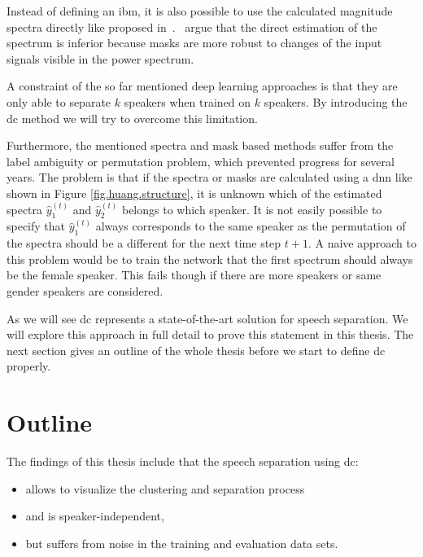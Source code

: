 Instead of defining an \gls{ibm}, it is also possible to use the calculated magnitude spectra directly like proposed in~\cite{Tu2014}.~\textcite{Qian2018} argue that the direct estimation of the spectrum is inferior because masks are more robust to changes of the input signals visible in the power spectrum.

A constraint of the so far mentioned deep learning approaches is that they are only able to separate $k$ speakers when trained on $k$ speakers. By introducing the \gls{dc} method we will try to overcome this limitation.

\label{sec.challenges.label-permutation}
Furthermore, the mentioned spectra and mask based methods suffer from the label ambiguity or permutation problem, which prevented progress for several years.
The problem is that if the spectra or masks are calculated using a \gls{dnn} like shown in Figure \ref{fig.huang.structure}, it is unknown which of the estimated spectra $\hat{y}_1^{(t)}$ and $\hat{y}_2^{(t)}$ belongs to which speaker. It is not easily possible to specify that $\hat{y}_1^{(t)}$ always corresponds to the same speaker as the permutation of the spectra should be a different for the next time step $t+1$. A naive approach to this problem would be to train the network that the first spectrum should always be the female speaker. This fails though if there are more speakers or same gender speakers are considered.~\cite[p.~4]{Kolbaek2017}


As we will see \gls{dc} represents a state-of-the-art solution for speech separation. We will explore this approach in full detail to prove this statement in this thesis. The next section gives an outline of the whole thesis before we start to define \gls{dc} properly.

\section{Outline}

The findings of this thesis include that the speech separation using \acrlong{dc}:

\begin{itemize}
	\item allows to visualize the clustering and separation process
	\item and is speaker-independent,
	\item but suffers from noise in the training and evaluation data sets.
\end{itemize}

